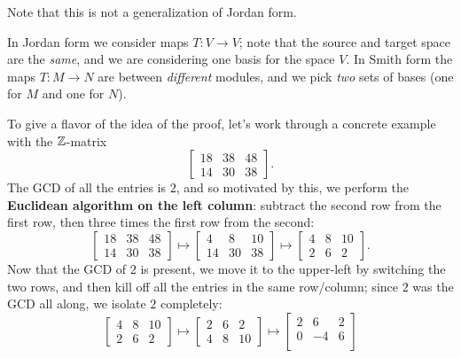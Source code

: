 \begin{remark}
	Note that this is not a generalization of Jordan form.
	\begin{itemize}
		\ii In Jordan form we consider maps $T : V \to V$;
		note that the source and target space are the \emph{same},
		and we are considering one basis for the space $V$.
		\ii In Smith form the maps $T : M \to N$ are between
		\emph{different} modules, and we pick \emph{two} sets of bases
		(one for $M$ and one for $N$).
	\end{itemize}
\end{remark}

\begin{example}
	To give a flavor of the idea of the proof,
	let's work through a concrete example with the $\mathbb Z$-matrix
	\[ \begin{bmatrix} 
			18 & 38 & 48 \\
			14 & 30 & 38
		\end{bmatrix}.  \]
	The GCD of all the entries is $2$, and so motivated by this,
	we perform the \textbf{Euclidean algorithm on the left column}:
	subtract the second row from the first row,
	then three times the first row from the second:
	\[ 
		\begin{bmatrix} 
			18 & 38 & 48 \\
			14 & 30 & 38
		\end{bmatrix} 
		\mapsto
		\begin{bmatrix} 
			4 & 8 & 10 \\
			14 & 30 & 38
		\end{bmatrix}
		\mapsto
		\begin{bmatrix} 
			4 & 8 & 10 \\
			2 & 6 & 2
		\end{bmatrix}.
	\]
	Now that the GCD of $2$ is present, we move it to the upper-left
	by switching the two rows,
	and then kill off all the entries in the same row/column;
	since $2$ was the GCD all along, we isolate $2$ completely:
	\[
		\begin{bmatrix} 
			4 & 8 & 10 \\
			2 & 6 & 2
		\end{bmatrix}
		\mapsto
		\begin{bmatrix} 
			2 & 6 & 2 \\
			4 & 8 & 10
		\end{bmatrix}
		\mapsto 
		\begin{bmatrix} 
			2 & 6 & 2 \\
			0 & -4 & 6 \\

\end{bmatrix}\]
\end{example}
